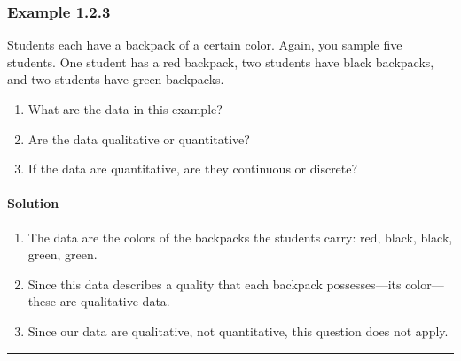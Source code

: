 \documentclass[letterpaper,10pt,english]{jupyterBook}
\begin{document}
\subsubsection{Example 1.2.3}
\label{\detokenize{Ch1 Sampling and Data/1.2 Scales of Measurement:example-1-2-3}}
\sphinxAtStartPar
Students each have a backpack of a certain color. Again, you sample five students. One student has a red backpack, two students have black backpacks, and two students have green backpacks.
\begin{enumerate}
%
\item {} 
\sphinxAtStartPar
What are the data in this example?

\item {} 
\sphinxAtStartPar
Are the data qualitative or quantitative?

\item {} 
\sphinxAtStartPar
If the data are quantitative, are they continuous or discrete?

\end{enumerate}


\paragraph{Solution}
\label{\detokenize{Ch1 Sampling and Data/1.2 Scales of Measurement:id3}}\begin{enumerate}
%
\item {} 
\sphinxAtStartPar
The data are the colors of the backpacks the students carry: red, black, black, green, green.

\item {} 
\sphinxAtStartPar
Since this data describes a quality that each backpack possesses—its color—these are qualitative data.

\item {} 
\sphinxAtStartPar
Since our data are qualitative, not quantitative, this question does not apply.

\end{enumerate}


\bigskip\hrule\bigskip
\end{document}
